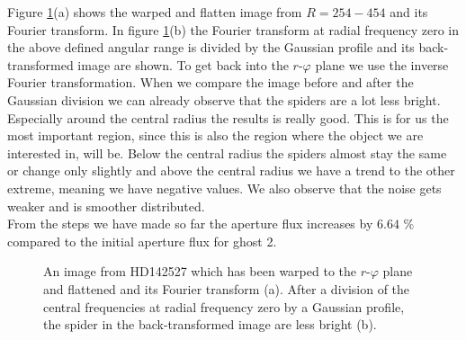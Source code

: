 Figure \ref{fig:HDsuppcentralfreq_R254_R454_-0.5to0.5}(a) shows the warped and flatten image from $R=254-454$ and its Fourier transform. In figure \ref{fig:HDsuppcentralfreq_R254_R454_-0.5to0.5}(b) the Fourier transform at radial frequency zero in the above defined angular range is divided by the Gaussian profile and its back-transformed image are shown. To get back into the $r$-$\varphi$ plane we use the inverse Fourier transformation. When we compare the image before and after the Gaussian division we can already observe that the spiders are a lot less bright. Especially around the central radius the results is really good. This is for us the most important region, since this is also the region where the object we are interested in, will be. Below the central radius the spiders almost stay the same or change only slightly and above the central radius we have a trend to the other extreme, meaning we have negative values. We also observe that the noise gets weaker and is smoother distributed.\\
From the steps we have made so far the aperture flux increases by $6.64$ \% compared to the initial aperture flux for ghost 2. 
\begin{figure}[H]
	\centering
\caption{An image from HD142527 which has been warped to the $r$-$\varphi$ plane and flattened and its Fourier transform (a). After a division of the central frequencies at radial frequency zero by a Gaussian profile, the spider in the back-transformed image are less bright (b).}
\label{fig:HDsuppcentralfreq_R254_R454_-0.5to0.5}
\end{figure}

